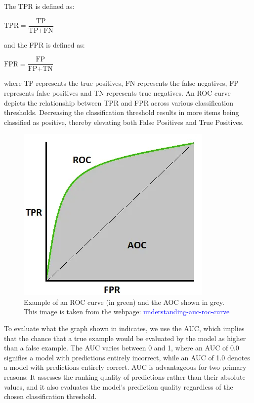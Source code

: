 \documentclass{l4proj}
\begin{document}
The TPR is defined as: 

\begin{center}
    $\text{TPR} = \dfrac{\text{TP}}{\text{TP} + \text{FN}}$ \\
\end{center}

and the FPR is defined as: 

\begin{center}
    $\text{FPR} = \dfrac{\text{FP}}{\text{FP} + \text{TN}}$
\end{center}

where TP represents the true positives, FN represents the false negatives, FP represents false positives and TN represents true negatives. An ROC curve depicts the relationship between TPR and FPR across various classification thresholds. Decreasing the classification threshold results in more items being classified as positive, thereby elevating both False Positives and True Positives. \\ 

\begin{figure}[h]
    \centering
    \includegraphics[width=0.5\linewidth]{images/roc_auc.png}
    \caption{Example of an ROC curve (in green) and the AOC shown in grey. This image is taken from the webpage: \href{https://towardsdatascience.com/understanding-auc-roc-curve-68b2303cc9c5}{\textcolor{blue}{understanding-auc-roc-curve}}}
    \label{fig:roc_auc}
\end{figure}

To evaluate what the graph shown in  indicates, we use the AUC, which implies that the chance that a true example would be evaluated by the model as higher than a false example. The AUC varies between 0 and 1, where an AUC of 0.0 signifies a model with predictions entirely incorrect, while an AUC of 1.0 denotes a model with predictions entirely correct. AUC is advantageous for two primary reasons: It assesses the ranking quality of predictions rather than their absolute values, and it also evaluates the model's prediction quality regardless of the chosen classification threshold. \\
\end{document}
